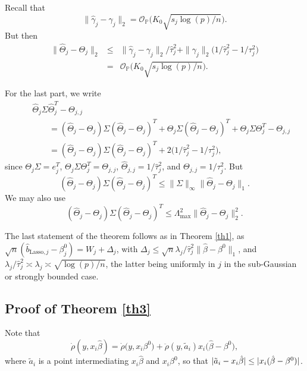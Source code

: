 \documentclass[aos,MSNbibl,dvips]{arximspdf}
\newcommand{\PP}{\mathbb{P}}
\begin{document}
Recall that
%
\[
\| \hat\gamma_j - \gamma_j \|_2 = {
\mathcal O}_{\PP} \bigl( K_0 \sqrt{s_j \log(p)/
n } \bigr). %
\]
%
But then
%
\begin{eqnarray*}
\| \hat\Theta_j - \Theta_j \|_2 &\le&\| \hat
\gamma_j - \gamma_j \| _2 / \hat
\tau_j^2 + \| \gamma_j \|_2
\bigl( 1/ \hat\tau_j^2 - 1 / \tau_j^2
\bigr) %
\\
&=& {\mathcal O}_{\PP} \bigl(K_0 \sqrt{s_j
\log(p)/ n }\bigr). %
\end{eqnarray*}

For the last part, we write
%
\begin{eqnarray*}
&&\hat\Theta_j\Sigma\hat\Theta_j^T -
\Theta_{j,j} %
\\
&&\qquad= ( \hat\Theta_j - \Theta_j) \Sigma( \hat
\Theta_j - \Theta_j)^T +
\Theta_j \Sigma( \hat\Theta_j - \Theta_j
)^T + \Theta_j\Sigma\Theta_j^T
- \Theta_{j,j} %
\\
&&\qquad= ( \hat\Theta_j - \Theta_j) \Sigma( \hat
\Theta_j - \Theta_j)^T + 2\bigl(1/ \hat
\tau_j^2 - 1/ \tau_j^2 \bigr),
%
\end{eqnarray*}
%
since $\Theta_j \Sigma= e_j^T$, $\Theta_j\Sigma\Theta_j^T = \Theta_{j,j}$,
$\hat\Theta_{j,j} = 1/ \hat\tau_j^2$, and $\Theta_{j,j} = 1/ \tau
_j^2 $.
But
%
\[
( \hat\Theta_j - \Theta_j) \Sigma( \hat
\Theta_j - \Theta_j)^T \le\| \Sigma
\|_{\infty} \| \hat\Theta_j - \Theta_j
\|_1. %
\]
%
We may also use
%
\[
( \hat\Theta_j - \Theta_j) \Sigma( \hat
\Theta_j - \Theta_j)^T \le
\Lambda_\mathrm{max}^2 \| \hat\Theta_j -
\Theta_j \|_2^2.
\]

The last statement of the theorem follows as in Theorem \ref{th1},
as\break
$\sqrt n ( \hat b_{\mathrm{Lasso}, j} - \beta_j^0 ) = W_j + \Delta_j $, with
$\Delta_j \le\sqrt{n} \lambda_j / \hat\tau_j^2 \| \hat\beta-
\beta
^0 \|_1 $,
and $\lambda_j / \hat\tau_j^2 \asymp\lambda_j \asymp\sqrt{\log(p)
/ n }$, the latter being
uniformly in $j$ in the sub-Gaussian or strongly bounded case.

\subsection{Proof of Theorem \protect\ref{th3}}\label{th3section}

Note that
%
\[
\dot\rho( y, x_i \hat\beta) = \dot\rho\bigl( y, x_i
\beta^0\bigr) + \ddot\rho( y, \tilde a_i)
x_i\bigl( \hat\beta- \beta^0\bigr), %
\]
%
where $\tilde a_i$ is a point intermediating $x_i \hat\beta$ and $x_i
\beta^0$, so that
$| \tilde a_i - x_i \hat\beta| \le\break | x_i(\hat\beta- \beta^0) | $.
\end{document}
